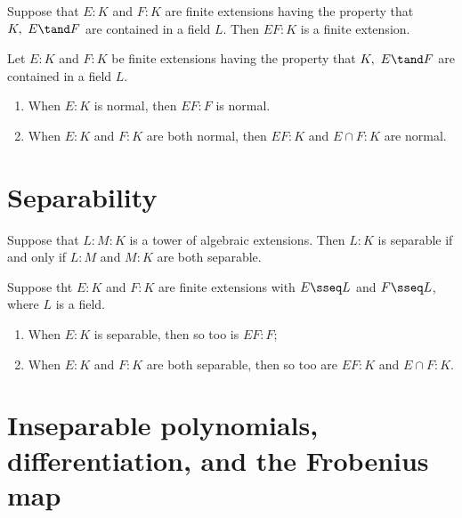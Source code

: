 \documentclass[a4paper]{article}
\begin{document}
\begin{tproposition}
  Suppose that \( E:K \) and \( F:K \) are finite extensions having the property that \( K,\ E\tand F \) are contained in a field \( L \).
  Then \( EF:K \) is a finite extension.
\end{tproposition}

\begin{ttheorem}
  Let \( E:K \) and \( F:K \) be finite extensions having the property that \( K,\ E\tand F \) are contained in a field \( L \). \begin{enumerate}[label=(\alph*)]
    \item When \( E:K \) is normal, then \( EF:F \) is normal.
    \item When \( E:K \) and \( F:K \) are both normal, then \( EF:K \) and \( E\cap F:K \) are normal.
  \end{enumerate}
\end{ttheorem}


\section{Separability} %
\setcounter{tdefinition}{24}

\begin{ttheorem}
  Suppose that \( L:M:K \) is a tower of algebraic extensions.
  Then \( L:K \) is separable if and only if \( L:M \) and \( M:K \) are both separable.
\end{ttheorem}

\begin{ttheorem}
  Suppose tht \( E:K \) and \( F:K \) are finite extensions with \( E\sseq L \) and \( F\sseq L \), where \( L \) is a field.
  \begin{enumerate}[label=(\alph*)]
    \item When \( E:K \) is separable, then so too is \( EF:F \);
    \item When \( E:K \) and \( F:K \) are both separable, then so too are \( EF:K \) and \( E\cap F:K \).
  \end{enumerate}
\end{ttheorem}

\section{Inseparable polynomials, differentiation, and the Frobenius map}
\end{document}
